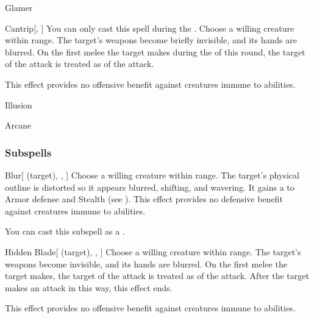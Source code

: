 \newpage
\begin{spellsection}{Glamer}

\begin{spellheader}
\spelldesc{}
\end{spellheader}


\begin{ability}{Cantrip}[, ]
You can only cast this spell during the .
Choose a willing creature within \rngclose range.
The target's weapons become briefly invisible, and its hands are blurred.
On the first melee  the target makes during the  of this round, the target of the attack is treated as  of the attack.

This effect provides no offensive benefit against creatures immune to  abilities.
\end{ability}




 Illusion

 Arcane
\end{spellsection}


\subsubsection{Subspells}


\begin{ability}[\nth{1}]{Blur}[ (target), , ]
Choose a willing creature within \rngmed range.
The target's physical outline is distorted so it appears blurred, shifting, and wavering.
It gains a   to Armor defense and Stealth (see ).
This effect provides no defensive benefit against creatures immune to  abilities.

You can cast this subspell as a .
\end{ability}
\vspace{0.25em}


\begin{ability}[\nth{1}]{Hidden Blade}[ (target), , ]
Choose a willing creature within \rngclose range.
The target's weapons become invisible, and its hands are blurred.
On the first melee  the target makes, the target of the attack is treated as  of the attack.
After the target makes an attack in this way, this effect ends.

This effect provides no offensive benefit against creatures immune to  abilities.
\end{ability}
\vspace{0.25em}


